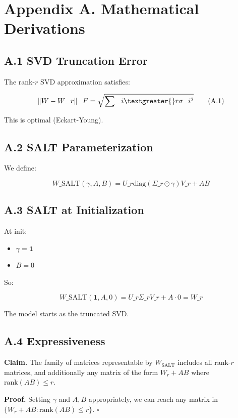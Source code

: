 
\section{Appendix A. Mathematical Derivations}

\subsection{A.1 SVD Truncation Error}

The rank-$r$ SVD approximation satisfies:

\[
\|W - W\_r\|\_F = \sqrt{\sum\_{i \textgreater{} r} \sigma\_i^2}
\tag{A.1}
\]

This is optimal (Eckart-Young).

\subsection{A.2 SALT Parameterization}

We define:

\[
W\_\text{SALT}(\gamma, A, B) = U\_r \text{diag}(\Sigma\_r \odot \gamma) V\_r + AB
\tag{A.2}
\]

\subsection{A.3 SALT at Initialization}

At init:

\begin{itemize}
\item $\gamma = \mathbf{1}$
\item $B = 0$

\end{itemize}
So:

\[
W\_\text{SALT}(\mathbf{1}, A, 0) = U\_r \Sigma\_r V\_r + A \cdot 0 = W\_r
\tag{A.3}
\]

The model starts as the truncated SVD.

\subsection{A.4 Expressiveness}

\textbf{Claim.} The family of matrices representable by $W_\text{SALT}$ includes 
all rank-$r$ matrices, and additionally any matrix of the form 
$W_r + AB$ where $\text{rank}(AB) \leq r$.

\textbf{Proof.} Setting $\gamma$ and $A, B$ appropriately, we can reach any 
matrix in $\{W_r + AB : \text{rank}(AB) \leq r\}$. $\square$


